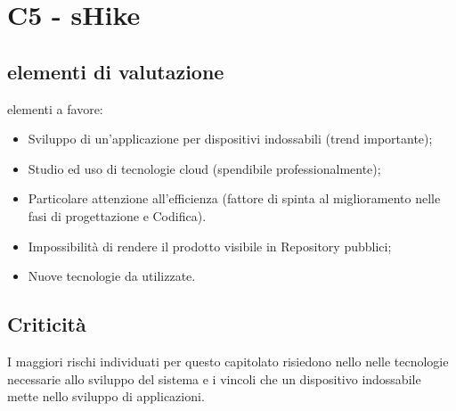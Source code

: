 \section{C5 - sHike}{
	\subsection{elementi di valutazione}{
		elementi a favore:
		\begin{itemize}
			\item Sviluppo di un'applicazione per dispositivi indossabili (trend importante);
			\item Studio ed uso di tecnologie cloud (spendibile professionalmente);
			\item Particolare attenzione all'efficienza (fattore di spinta al miglioramento nelle fasi di progettazione e Codifica).
		\end{itemize}
		
		\begin{itemize}
			\item Impossibilità di rendere il prodotto visibile in Repository pubblici;
			\item Nuove tecnologie da utilizzate.
		\end{itemize}
	}
	\subsection{Criticità}{
		I maggiori rischi individuati per questo capitolato risiedono nello nelle tecnologie necessarie allo sviluppo del sistema e i vincoli che un dispositivo indossabile mette nello sviluppo di applicazioni. 
	}
}